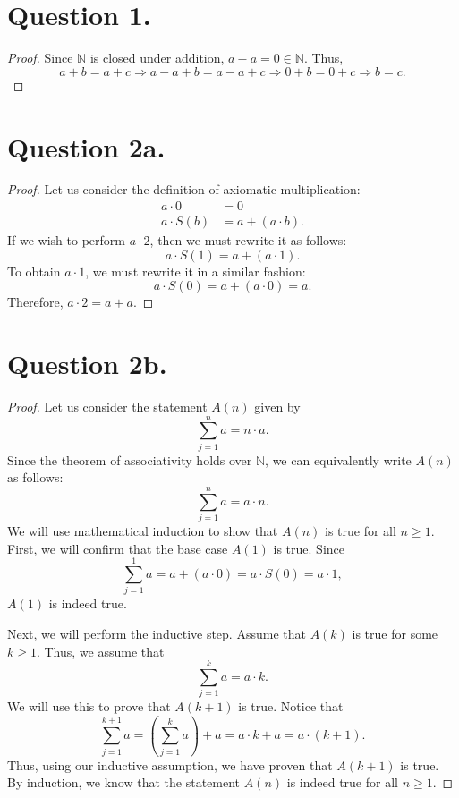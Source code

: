 \documentclass{article}
\begin{document}
\section*{Question 1.}
\begin{proof}
    Since $ \mathbb{N} $ is closed under addition, $ a - a = 0 \in \mathbb{N} $. Thus,
    \[
        a + b = a + c \Rightarrow a - a + b = a - a + c \Rightarrow 0 + b = 0 + c \Rightarrow b = c.
    \]
\end{proof}

\section*{Question 2a.}
\begin{proof}
    Let us consider the definition of axiomatic multiplication:
    \begin{align*}
        a \cdot 0 &= 0 \\
        a \cdot S(b) &= a + (a \cdot b).
    \end{align*}
    If we wish to perform $ a \cdot 2 $, then we must rewrite it as follows:
    \[
        a \cdot S(1) = a + (a \cdot 1).
    \]
    To obtain $ a \cdot 1 $, we must rewrite it in a similar fashion:
    \[
        a \cdot S(0) = a + (a \cdot 0) = a.
    \]
    Therefore, $ a \cdot 2 = a + a $.
\end{proof}

\section*{Question 2b.}
\begin{proof}
    Let us consider the statement $ A(n) $ given by
    \[
        \sum_{j=1}^n a = n \cdot a.
    \]
    Since the theorem of associativity holds over $ \mathbb{N} $, we can equivalently write $ A(n) $ as follows:
    \[
        \sum_{j=1}^n a = a \cdot n.
    \]
    We will use mathematical induction to show that $ A(n) $ is true for all $ n \geq 1 $. First, we will confirm that the base case $ A(1) $ is true.
    Since
    \[
        \sum_{j=1}^1 a = a + (a \cdot 0) = a \cdot S(0) = a \cdot 1,
    \]
    $ A(1) $ is indeed true.

    \noindent Next, we will perform the inductive step. Assume that $ A(k) $ is true for some $ k \geq 1 $. Thus, we assume that
    \[
        \sum_{j=1}^k a = a \cdot k.
    \]
    We will use this to prove that $ A(k + 1) $ is true. Notice that
    \[
        \sum_{j=1}^{k+1} a = \left(\sum_{j=1}^k a \right) + a = a \cdot k + a = a \cdot (k + 1).
    \]
    Thus, using our inductive assumption, we have proven that $ A(k + 1) $ is true. By induction, we know that the statement $ A(n) $ is indeed true for all $ n \geq 1 $.
\end{proof}
\end{document}
